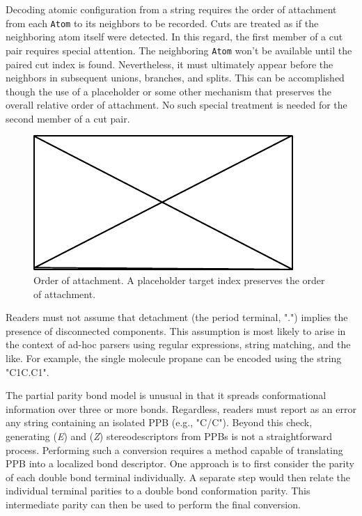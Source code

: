 \documentclass{article}
\def\ttt{\texttt}
\begin{document}
Decoding atomic configuration from a string requires the order of attachment from each \ttt{Atom} to its neighbors to be recorded. Cuts are treated as if the neighboring atom itself were detected. In this regard, the first member of a cut pair requires special attention. The neighboring \ttt{Atom} won't be available until the paired cut index is found. Nevertheless, it must ultimately appear before the neighbors in subsequent unions, branches, and splits. This can be accomplished though the use of a placeholder or some other mechanism that preserves the overall relative order of attachment. No such special treatment is needed for the second member of a cut pair.

\begin{figure}
    \centering
    \includegraphics{filler}
    \caption{Order of attachment. A placeholder target index preserves the order of attachment.}
    \label{fig:order-of-attachment}
\end{figure}

Readers must not assume that detachment (the period terminal, ".") implies the presence of disconnected components. This assumption is most likely to arise in the context of ad-hoc parsers using regular expressions, string matching, and the like. For example, the single molecule propane can be encoded using the string "C1C.C1".

The partial parity bond model is unusual in that it spreads conformational information over three or more bonds. Regardless, readers must report as an error any string containing an isolated PPB (e.g., "C/C"). Beyond this check, generating (\textit{E}) and (\textit{Z}) stereodescriptors from PPBs is not a straightforward process. Performing such a conversion requires a method capable of translating PPB into a localized bond descriptor. One approach is to first consider the parity of each double bond terminal individually. A separate step would then relate the individual terminal parities to a double bond conformation parity. This intermediate parity can then be used to perform the final conversion.
\end{document}
